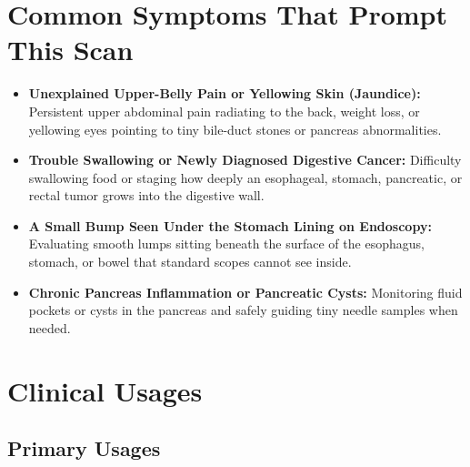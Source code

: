\section{Common Symptoms That Prompt This Scan}
\begin{itemize}
    \item \textbf{Unexplained Upper-Belly Pain or Yellowing Skin (Jaundice):} Persistent upper abdominal pain radiating to the back, weight loss, or yellowing eyes pointing to tiny bile-duct stones or pancreas abnormalities.
    \item \textbf{Trouble Swallowing or Newly Diagnosed Digestive Cancer:} Difficulty swallowing food or staging how deeply an esophageal, stomach, pancreatic, or rectal tumor grows into the digestive wall.
    \item \textbf{A Small Bump Seen Under the Stomach Lining on Endoscopy:} Evaluating smooth lumps sitting beneath the surface of the esophagus, stomach, or bowel that standard scopes cannot see inside.
    \item \textbf{Chronic Pancreas Inflammation or Pancreatic Cysts:} Monitoring fluid pockets or cysts in the pancreas and safely guiding tiny needle samples when needed.
\end{itemize}

\section{Clinical Usages}

\subsection{Primary Usages}

